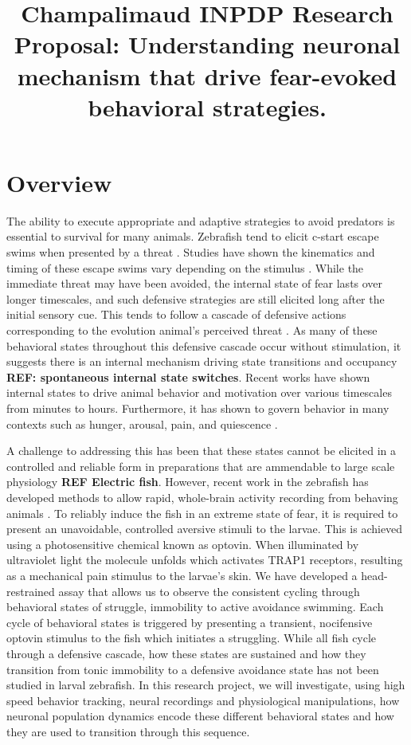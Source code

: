 \documentclass[]{article}
\title{Champalimaud INPDP Research Proposal: Understanding neuronal mechanism that drive fear-evoked behavioral strategies.}
\begin{document}
\maketitle

\section{Overview}

The ability to execute appropriate and adaptive strategies to avoid predators is essential to survival for many animals. Zebrafish tend to elicit c-start escape swims when presented by a threat \cite{OMalley1996}. Studies have shown the kinematics and timing of these escape swims vary depending on the stimulus \cite{Dunn2016, Bhattacharyya2017, Marques2019}. While the immediate threat may have been avoided, the internal state of fear lasts over longer timescales, and such defensive strategies are still elicited long after the initial sensory cue. This tends to follow a cascade of defensive actions corresponding to the evolution animal's perceived threat \cite{Bhandiwad_2021}. As many of these behavioral states throughout this defensive cascade occur without stimulation, it suggests there is an internal mechanism driving state transitions and occupancy \textbf{REF: spontaneous internal state switches}. Recent works have shown internal states to drive animal behavior and motivation over various timescales from minutes to hours. Furthermore, it has shown to govern behavior in many contexts such as hunger, arousal, pain, and quiescence \cite{Marques2019, Andalman2019, Cheng2016}.


A challenge to addressing this has been that these states cannot be elicited in a controlled and reliable form in preparations that are ammendable to large scale physiology \textbf{REF Electric fish}. However, recent work in the zebrafish has developed methods to allow rapid, whole-brain activity recording from behaving animals \cite{Chen_2013}. To reliably induce the fish in an extreme state of fear, it is required to present an unavoidable, controlled aversive stimuli to the larvae. This is achieved using a photosensitive chemical known as optovin. When illuminated by ultraviolet light the molecule unfolds which activates TRAP1 receptors, resulting as a mechanical pain stimulus to the larvae's skin. We have developed a head-restrained assay that allows us to observe the consistent cycling through behavioral states of struggle, immobility to active avoidance swimming. Each cycle of behavioral states is triggered by presenting a transient, nocifensive optovin stimulus to the fish which initiates a struggling. While all fish cycle through a defensive cascade, how these states are sustained and how they transition from tonic immobility to a defensive avoidance state has not been studied in larval zebrafish. In this research project, we will investigate, using high speed behavior tracking, neural recordings and physiological manipulations, how neuronal population dynamics encode these different behavioral states and how they are used to transition through this sequence.
\end{document}
